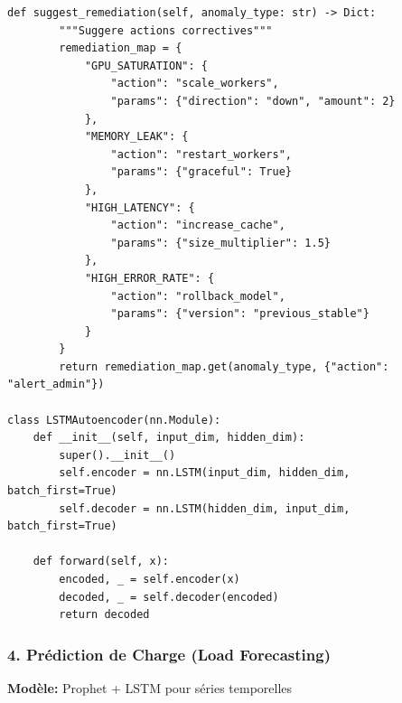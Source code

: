 \documentclass[12pt,a4paper]{article}
\begin{document}
\begin{lstlisting}[caption={Anomaly Detection System}]
    def suggest_remediation(self, anomaly_type: str) -> Dict:
        """Suggere actions correctives"""
        remediation_map = {
            "GPU_SATURATION": {
                "action": "scale_workers",
                "params": {"direction": "down", "amount": 2}
            },
            "MEMORY_LEAK": {
                "action": "restart_workers",
                "params": {"graceful": True}
            },
            "HIGH_LATENCY": {
                "action": "increase_cache",
                "params": {"size_multiplier": 1.5}
            },
            "HIGH_ERROR_RATE": {
                "action": "rollback_model",
                "params": {"version": "previous_stable"}
            }
        }
        return remediation_map.get(anomaly_type, {"action": "alert_admin"})

class LSTMAutoencoder(nn.Module):
    def __init__(self, input_dim, hidden_dim):
        super().__init__()
        self.encoder = nn.LSTM(input_dim, hidden_dim, batch_first=True)
        self.decoder = nn.LSTM(hidden_dim, input_dim, batch_first=True)
        
    def forward(self, x):
        encoded, _ = self.encoder(x)
        decoded, _ = self.decoder(encoded)
        return decoded
\end{lstlisting}

\subsubsection{4. Prédiction de Charge (Load Forecasting)}

\textbf{Modèle:} Prophet + LSTM pour séries temporelles
\end{document}
